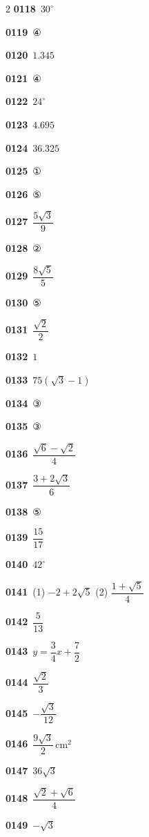 \documentclass[10pt,a4paper]{article}
\begin{document}
\begin{multicols}{2}
\noindent\textbf{0118}\ $30^\circ$\par
\noindent\textbf{0119}\ ④\par
\noindent\textbf{0120}\ $1.345$\par
\noindent\textbf{0121}\ ④\par
\noindent\textbf{0122}\ $24^\circ$\par
\noindent\textbf{0123}\ $4.695$\par
\noindent\textbf{0124}\ $36.325$\par
\noindent\textbf{0125}\ ①\par
\noindent\textbf{0126}\ ⑤\par
\noindent\textbf{0127}\ $\dfrac{5\sqrt{3}}{9}$\par
\noindent\textbf{0128}\ ②\par
\noindent\textbf{0129}\ $\dfrac{8\sqrt{5}}{5}$\par
\noindent\textbf{0130}\ ⑤\par
\noindent\textbf{0131}\ $\dfrac{\sqrt{2}}{2}$\par
\noindent\textbf{0132}\ $1$\par
\noindent\textbf{0133}\ $75(\sqrt{3}-1)$\par
\noindent\textbf{0134}\ ③\par
\noindent\textbf{0135}\ ③\par
\noindent\textbf{0136}\ $\dfrac{\sqrt{6}-\sqrt{2}}{4}$\par
\noindent\textbf{0137}\ $\dfrac{3+2\sqrt{3}}{6}$\par
\noindent\textbf{0138}\ ⑤\par
\noindent\textbf{0139}\ $\dfrac{15}{17}$\par
\noindent\textbf{0140}\ $42^\circ$\par
\noindent\textbf{0141}\ (1) $-2+2\sqrt{5}$ (2) $\dfrac{1+\sqrt{5}}{4}$\par
\noindent\textbf{0142}\ $\dfrac{5}{13}$\par
\noindent\textbf{0143}\ $y=\dfrac{3}{4}x+\dfrac{7}{2}$\par
\noindent\textbf{0144}\ $\dfrac{\sqrt{2}}{3}$\par
\noindent\textbf{0145}\ $-\dfrac{\sqrt{3}}{12}$\par
\noindent\textbf{0146}\ $\dfrac{9\sqrt{3}}{2}\,\mathrm{cm}^2$\par
\noindent\textbf{0147}\ $36\sqrt{3}$\par
\noindent\textbf{0148}\ $\dfrac{\sqrt{2}+\sqrt{6}}{4}$\par
\noindent\textbf{0149}\ $-\sqrt{3}$\par

\end{multicols}
\end{document}
